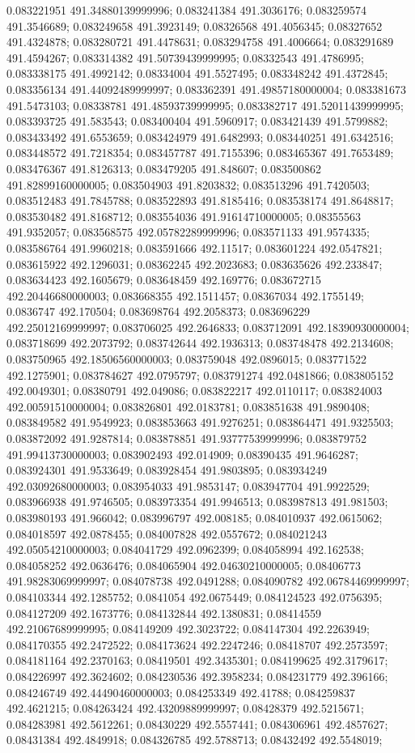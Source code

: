 0.083221951 491.34880139999996; 0.083241384 491.3036176; 0.083259574 491.3546689; 0.083249658 491.3923149; 0.08326568 491.4056345; 0.08327652 491.4324878; 0.083280721 491.4478631; 0.083294758 491.4006664; 0.083291689 491.4594267; 0.083314382 491.50739439999995; 0.08332543 491.4786995; 0.083338175 491.4992142; 0.08334004 491.5527495; 0.083348242 491.4372845; 0.083356134 491.44092489999997; 0.083362391 491.49857180000004; 0.083381673 491.5473103; 0.08338781 491.48593739999995; 0.083382717 491.52011439999995; 0.083393725 491.583543; 0.083400404 491.5960917; 0.083421439 491.5799882; 0.083433492 491.6553659; 0.083424979 491.6482993; 0.083440251 491.6342516; 0.083448572 491.7218354; 0.083457787 491.7155396; 0.083465367 491.7653489; 0.083476367 491.8126313; 0.083479205 491.848607; 0.083500862 491.82899160000005; 0.083504903 491.8203832; 0.083513296 491.7420503; 0.083512483 491.7845788; 0.083522893 491.8185416; 0.083538174 491.8648817; 0.083530482 491.8168712; 0.083554036 491.91614710000005; 0.08355563 491.9352057; 0.083568575 492.05782289999996; 0.083571133 491.9574335; 0.083586764 491.9960218; 0.083591666 492.11517; 0.083601224 492.0547821; 0.083615922 492.1296031; 0.08362245 492.2023683; 0.083635626 492.233847; 0.083634423 492.1605679; 0.083648459 492.169776; 0.083672715 492.20446680000003; 0.083668355 492.1511457; 0.08367034 492.1755149; 0.0836747 492.170504; 0.083698764 492.2058373; 0.083696229 492.25012169999997; 0.083706025 492.2646833; 0.083712091 492.18390930000004; 0.083718699 492.2073792; 0.083742644 492.1936313; 0.083748478 492.2134608; 0.083750965 492.18506560000003; 0.083759048 492.0896015; 0.083771522 492.1275901; 0.083784627 492.0795797; 0.083791274 492.0481866; 0.083805152 492.0049301; 0.08380791 492.049086; 0.083822217 492.0110117; 0.083824003 492.00591510000004; 0.083826801 492.0183781; 0.083851638 491.9890408; 0.083849582 491.9549923; 0.083853663 491.9276251; 0.083864471 491.9325503; 0.083872092 491.9287814; 0.083878851 491.93777539999996; 0.083879752 491.99413730000003; 0.083902493 492.014909; 0.08390435 491.9646287; 0.083924301 491.9533649; 0.083928454 491.9803895; 0.083934249 492.03092680000003; 0.083954033 491.9853147; 0.083947704 491.9922529; 0.083966938 491.9746505; 0.083973354 491.9946513; 0.083987813 491.981503; 0.083980193 491.966042; 0.083996797 492.008185; 0.084010937 492.0615062; 0.084018597 492.0878455; 0.084007828 492.0557672; 0.084021243 492.05054210000003; 0.084041729 492.0962399; 0.084058994 492.162538; 0.084058252 492.0636476; 0.084065904 492.04630210000005; 0.08406773 491.98283069999997; 0.084078738 492.0491288; 0.084090782 492.06784469999997; 0.084103344 492.1285752; 0.0841054 492.0675449; 0.084124523 492.0756395; 0.084127209 492.1673776; 0.084132844 492.1380831; 0.08414559 492.21067689999995; 0.084149209 492.3023722; 0.084147304 492.2263949; 0.084170355 492.2472522; 0.084173624 492.2247246; 0.08418707 492.2573597; 0.084181164 492.2370163; 0.08419501 492.3435301; 0.084199625 492.3179617; 0.084226997 492.3624602; 0.084230536 492.3958234; 0.084231779 492.396166; 0.084246749 492.44490460000003; 0.084253349 492.41788; 0.084259837 492.4621215; 0.084263424 492.43209889999997; 0.08428379 492.5215671; 0.084283981 492.5612261; 0.08430229 492.5557441; 0.084306961 492.4857627; 0.08431384 492.4849918; 0.084326785 492.5788713; 0.08432492 492.5548019; 